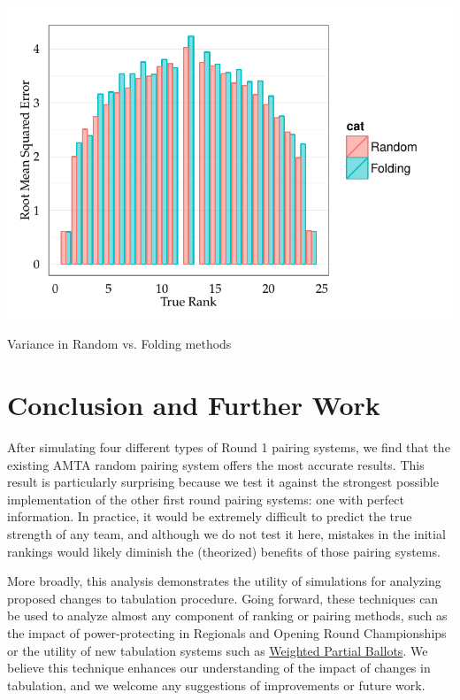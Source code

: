 \documentclass{tufte-handout}
\begin{document}
\begin{marginfigure}%
  \includegraphics[width=\linewidth]{rmse_ranfold.pdf}
  \caption{Variance in Random vs. Folding methods}
  \label{fig:ranfold_rmse}
\end{marginfigure}

\section{Conclusion and Further Work}
After simulating four different types of Round 1 pairing systems, we find that the existing AMTA random pairing system offers the most accurate results. This result is particularly surprising because we test it against the strongest possible implementation of the other first round pairing systems: one with perfect information. In practice, it would be extremely difficult to predict the true strength of any team, and although we do not test it here, mistakes in the initial rankings would likely diminish the (theorized) benefits of those pairing systems.

More broadly, this analysis demonstrates the utility of simulations for analyzing proposed changes to tabulation procedure. Going forward, these techniques can be used to analyze almost any component of ranking or pairing methods, such as the impact of power-protecting in Regionals and Opening Round Championships or the utility of new tabulation systems such as \href{http://anniejw.com/WPB/}{Weighted Partial Ballots}. We believe this technique enhances our understanding of the impact of changes in tabulation, and we welcome any suggestions of improvements or future work.
\end{document}
